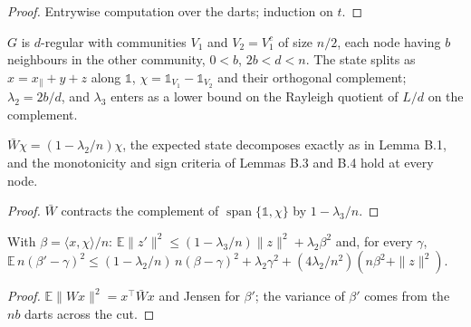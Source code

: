 \begin{proof}\leanok
Entrywise computation over the darts; induction on $t$.
\end{proof}
\begin{definition}\label{def:opp-clustered}
\leanok
$G$ is $d$-regular with communities $V_1$ and $V_2=V_1^c$ of size $n/2$, each node having $b$
neighbours in the other community, $0<b$, $2b<d<n$. The state splits as $x=x_\parallel+y+z$ along
$\mathbb 1$, $\chi=\mathbb 1_{V_1}-\mathbb 1_{V_2}$ and their orthogonal complement;
$\lambda_2=2b/d$, and $\lambda_3$ enters as a lower bound on the Rayleigh quotient of $L/d$ on
the complement.
\end{definition}
\begin{theorem}\label{thm:opp-31}
\leanok{}
$\bar W\chi=(1-\lambda_2/n)\chi$, the expected state decomposes exactly as in Lemma B.1, and the
monotonicity and sign criteria of Lemmas B.3 and B.4 hold at every node.
\end{theorem}
\begin{proof}\leanok
$\bar W$ contracts the complement of $\operatorname{span}\{\mathbb 1,\chi\}$ by
$1-\lambda_3/n$.
\end{proof}
\begin{lemma}\label{lem:opp-onestep}
\leanok{}
With $\beta=\langle x,\chi\rangle/n$: $\mathbb E\|z'\|^2\le(1-\lambda_3/n)\|z\|^2+\lambda_2\beta^2$ and,
for every $\gamma$, $\mathbb E\,n(\beta'-\gamma)^2\le(1-\lambda_2/n)\,n(\beta-\gamma)^2+\lambda_2\gamma^2
+(4\lambda_2/n^2)(n\beta^2+\|z\|^2)$.
\end{lemma}
\begin{proof}\leanok
$\mathbb E\|Wx\|^2=x^\top\bar Wx$ and Jensen for $\beta'$; the variance of $\beta'$ comes from the
$nb$ darts across the cut.
\end{proof}
